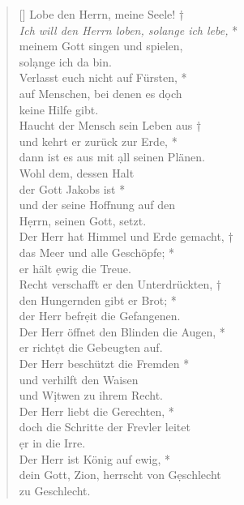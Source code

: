 \begin{verse}[\versewidth]
 Lobe den Herrn, meine Seele! †\\
\textit{Ich will den Herrn loben, solange ich lebe,} *\\
meinem Gott singen und spielen,\\ sol\d ange ich da bin. \\
\vin Verlasst euch nicht auf Fürsten, *\\
\vin auf Menschen, bei denen es d\d och \\ \vin keine Hilfe gibt. \\
Haucht der Mensch sein Leben aus †\\
und kehrt er zurück zur Erde, * \\
dann ist es aus mit \d all seinen Plänen. \\
\vin Wohl dem, dessen Halt \\ \vin der Gott Jakobs ist *\\
\vin und der seine Hoffnung auf den\\ \vin H\d errn, seinen Gott, setzt. \\
Der Herr hat Himmel und Erde gemacht, †\\
das Meer und alle Geschöpfe; * \\
er hält \d ewig die Treue.\\
\vin Recht verschafft er den Unterdrückten, †\\
\vin den Hungernden gibt er Brot; *\\
\vin  der Herr befr\d eit die Gefangenen. \\
Der Herr öffnet den Blinden die Augen, *\\
er richt\d et die Gebeugten auf. \\
\vin Der Herr beschützt die Fremden *\\
\vin und verhilft den Waisen \\ \vin und W\d itwen zu ihrem Recht. \\
Der Herr liebt die Gerechten, * \\
doch die Schritte der Frevler leitet\\ \d er in die Irre.\\
\vin Der Herr ist König auf ewig, *\\
\vin dein Gott, Zion, herrscht von G\d eschlecht \\ \vin zu Geschlecht.\\

\end{verse}


\vspace{0.3cm}


